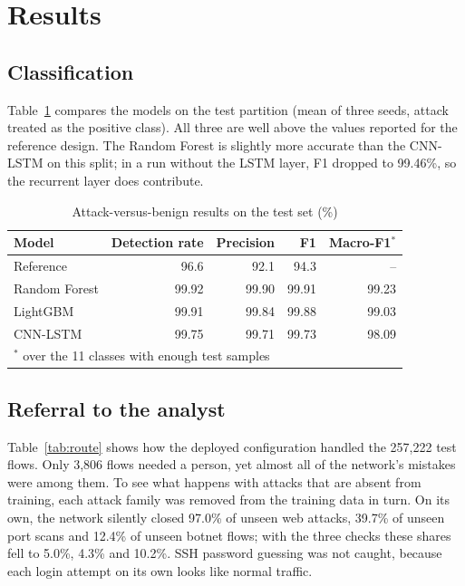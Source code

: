 \documentclass[conference]{IEEEtran}
\begin{document}
\section{Results}
\subsection{Classification}
Table~\ref{tab:cls} compares the models on the test partition (mean of three seeds, attack treated
as the positive class). All three are well above the values reported for the reference design.
The Random Forest is slightly more accurate than the CNN-LSTM on this split; in a run without the
LSTM layer, F1 dropped to 99.46\%, so the recurrent layer does contribute.

\begin{table}[t]
\centering
\caption{Attack-versus-benign results on the test set (\%)}
\label{tab:cls}
\setlength{\tabcolsep}{4pt}
\begin{tabular}{lrrrr}
\toprule
Model & Detection rate & Precision & F1 & Macro-F1$^\ast$ \\
\midrule
Reference \cite{refpaper2025} & 96.6 & 92.1 & 94.3 & -- \\
Random Forest & 99.92 & 99.90 & 99.91 & 99.23 \\
LightGBM & 99.91 & 99.84 & 99.88 & 99.03 \\
CNN-LSTM & 99.75 & 99.71 & 99.73 & 98.09 \\
\bottomrule
\multicolumn{5}{l}{\footnotesize $^\ast$ over the 11 classes with enough test samples}
\end{tabular}
\end{table}

\subsection{Referral to the analyst}
Table~\ref{tab:route} shows how the deployed configuration handled the 257,222 test flows. Only
3,806 flows needed a person, yet almost all of the network's mistakes were among them. To see what
happens with attacks that are absent from training, each attack family was removed from the
training data in turn. On its own, the network silently closed 97.0\% of unseen web attacks,
39.7\% of unseen port scans and 12.4\% of unseen botnet flows; with the three checks these shares
fell to 5.0\%, 4.3\% and 10.2\%. SSH password guessing was not caught, because each login
attempt on its own looks like normal traffic.
\end{document}
